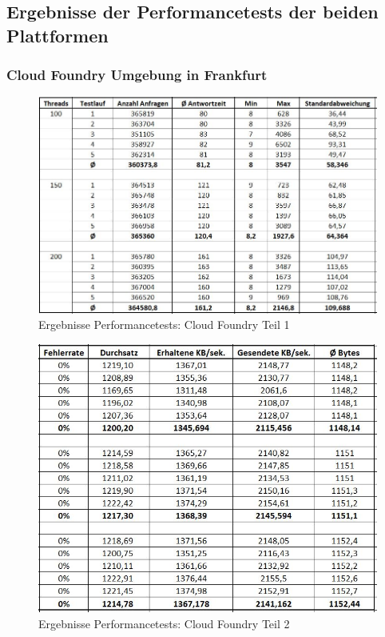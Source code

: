 \subsection{Ergebnisse der Performancetests der beiden Plattformen}
\label{section_performance_test}
\subsubsection{Cloud Foundry Umgebung in Frankfurt}
\label{section_performance_test_cf}
\begin{figure}[h]
	\begin{center}
		\includegraphics[width=16cm]{img/performance_cf_1.JPG}
		\caption[Performancetests: Cloud Foundry Teil 1]{Ergebnisse Performancetests: Cloud Foundry Teil 1}
		\label{performance_cf_1}
	\end{center}
\end{figure}
\newpage
\begin{figure}[h]
	\begin{center}
		\includegraphics[width=16cm]{img/performance_cf_2.JPG}
		\caption[Performancetests: Cloud Foundry Teil 2]{Ergebnisse Performancetests: Cloud Foundry Teil 2}
		\label{performance_cf_2}
	\end{center}
\end{figure}
\newpage
